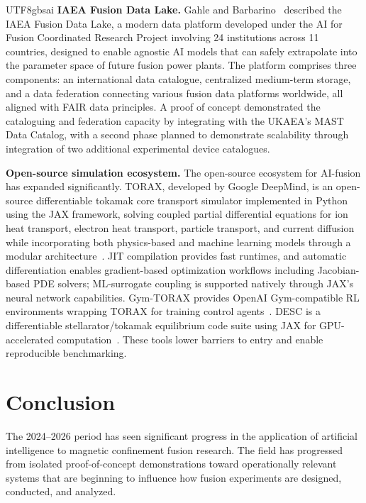 \documentclass[12pt,a4paper]{article}
\begin{document}
\begin{CJK}{UTF8}{gbsai}
\textbf{IAEA Fusion Data Lake.} Gahle and Barbarino~\citep{Gahle2026} described the IAEA Fusion Data Lake, a modern data platform developed under the AI for Fusion Coordinated Research Project involving 24 institutions across 11 countries, designed to enable agnostic AI models that can safely extrapolate into the parameter space of future fusion power plants. The platform comprises three components: an international data catalogue, centralized medium-term storage, and a data federation connecting various fusion data platforms worldwide, all aligned with FAIR data principles. A proof of concept demonstrated the cataloguing and federation capacity by integrating with the UKAEA's MAST Data Catalog, with a second phase planned to demonstrate scalability through integration of two additional experimental device catalogues.

\textbf{Open-source simulation ecosystem.} The open-source ecosystem for AI-fusion has expanded significantly. TORAX, developed by Google DeepMind, is an open-source differentiable tokamak core transport simulator implemented in Python using the JAX framework, solving coupled partial differential equations for ion heat transport, electron heat transport, particle transport, and current diffusion while incorporating both physics-based and machine learning models through a modular architecture~\citep{Citrin2024TORAX}. JIT compilation provides fast runtimes, and automatic differentiation enables gradient-based optimization workflows including Jacobian-based PDE solvers; ML-surrogate coupling is supported natively through JAX's neural network capabilities. Gym-TORAX provides OpenAI Gym-compatible RL environments wrapping TORAX for training control agents~\citep{Mouchamps2025}. DESC is a differentiable stellarator/tokamak equilibrium code suite using JAX for GPU-accelerated computation~\citep{Dudt2024}. These tools lower barriers to entry and enable reproducible benchmarking.

\section{Conclusion}

The 2024--2026 period has seen significant progress in the application of artificial intelligence to magnetic confinement fusion research. The field has progressed from isolated proof-of-concept demonstrations toward operationally relevant systems that are beginning to influence how fusion experiments are designed, conducted, and analyzed.


\end{CJK}
\end{document}
